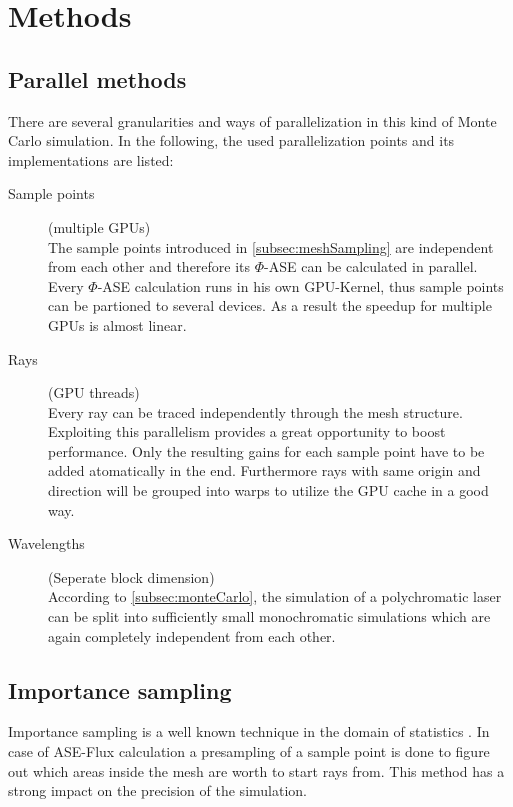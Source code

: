 \section{Methods}
\subsection{Parallel methods}
There are several granularities and ways of parallelization in this kind of 
Monte Carlo simulation. In the following, the used parallelization points and
its implementations are listed:

\begin{description}

  \item[Sample points] (multiple GPUs)\\
    The sample points introduced in \ref{subsec:meshSampling} are independent from each other
    and therefore its $\Phi$-ASE can be calculated in parallel. Every $\Phi$-ASE
    calculation runs in his own GPU-Kernel, thus sample points can be partioned 
    to several devices. As a result the speedup for multiple GPUs is almost linear.

  \item[Rays] (GPU threads)\\
    Every ray can be traced independently through the mesh structure.
    Exploiting this parallelism provides a great opportunity to boost
    performance. Only the resulting gains for each sample point have to be
    added atomatically in the end.
    Furthermore rays with same origin and direction will be grouped
    into warps to utilize the GPU cache in a good way.

  \item[Wavelengths] (Seperate block dimension)\\
    According to \ref{subsec:monteCarlo}, the simulation of a polychromatic
    laser can be split into sufficiently small monochromatic simulations which
    are again completely independent from each other.

\end{description}

\subsection{Importance sampling}
Importance sampling is a well known technique in the domain
of statistics \cite{importanceSamplingSource}. In case of 
ASE-Flux calculation a presampling of a sample point is done
to figure out which areas inside the mesh are worth to start rays from.
This method has a strong impact on the precision of the
simulation.

